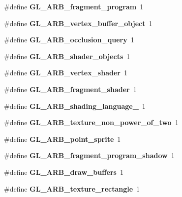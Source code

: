 \begin{DoxyCompactItemize}
\item 
\#define {\bfseries G\+L\+\_\+\+A\+R\+B\+\_\+fragment\+\_\+program}~1\label{_s_d_l__opengl_8h_a01a44bfe9e6da873e19ad87583c6b04d}

\item 
\#define {\bfseries G\+L\+\_\+\+A\+R\+B\+\_\+vertex\+\_\+buffer\+\_\+object}~1\label{_s_d_l__opengl_8h_a99fc8b180717c73753c461098e37c452}

\item 
\#define {\bfseries G\+L\+\_\+\+A\+R\+B\+\_\+occlusion\+\_\+query}~1\label{_s_d_l__opengl_8h_a21aae7ffb3cca75daf035c92d2ef9aa8}

\item 
\#define {\bfseries G\+L\+\_\+\+A\+R\+B\+\_\+shader\+\_\+objects}~1\label{_s_d_l__opengl_8h_a70f2e5381f5b9fc88fd7617e05020e86}

\item 
\#define {\bfseries G\+L\+\_\+\+A\+R\+B\+\_\+vertex\+\_\+shader}~1\label{_s_d_l__opengl_8h_adafcade072d8d1f04d9e219c6496e4a6}

\item 
\#define {\bfseries G\+L\+\_\+\+A\+R\+B\+\_\+fragment\+\_\+shader}~1\label{_s_d_l__opengl_8h_a180d9703bac6a79edefaf9015c9dab4a}

\item 
\#define {\bfseries G\+L\+\_\+\+A\+R\+B\+\_\+shading\+\_\+language\+\_}~1\label{_s_d_l__opengl_8h_a58493e4b7f1f99171d3c1f762bc9875e}

\item 
\#define {\bfseries G\+L\+\_\+\+A\+R\+B\+\_\+texture\+\_\+non\+\_\+power\+\_\+of\+\_\+two}~1\label{_s_d_l__opengl_8h_a5f895aaa09e48f3a6ba6519ed5f4d378}

\item 
\#define {\bfseries G\+L\+\_\+\+A\+R\+B\+\_\+point\+\_\+sprite}~1\label{_s_d_l__opengl_8h_a53c358b0ed41ead6278cebab2b95d78f}

\item 
\#define {\bfseries G\+L\+\_\+\+A\+R\+B\+\_\+fragment\+\_\+program\+\_\+shadow}~1\label{_s_d_l__opengl_8h_a633fe63037b0146a33772ca76c784bc5}

\item 
\#define {\bfseries G\+L\+\_\+\+A\+R\+B\+\_\+draw\+\_\+buffers}~1\label{_s_d_l__opengl_8h_a7dd126744746bfa7de287cc0af950aec}

\item 
\#define {\bfseries G\+L\+\_\+\+A\+R\+B\+\_\+texture\+\_\+rectangle}~1\label{_s_d_l__opengl_8h_ab4337865034c450613e9f64a4a93f3ba}


\end{DoxyCompactItemize}
